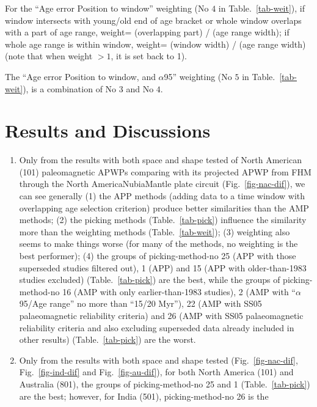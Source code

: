 For the ``Age error Position to window'' weighting (No $4$ in
Table.~\ref{tab-weit}), if window intersects with young/old end of age bracket
or whole window overlaps with a part of age range, weight= (overlapping part)
/ (age range width); if whole age range is within window, weight= (window width)
/ (age range width) (note that when weight $>1$, it is set back to 1).

The ``Age error Position to window, and $\alpha$95'' weighting (No $5$ in
Table.~\ref{tab-weit}), is a combination of No $3$ and No $4$.

\section{Results and Discussions}

\begin{enumerate}
  \item Only from the results with both space and shape tested of North American
        (101) paleomagnetic APWPs comparing with its projected APWP from FHM
        through the North America\textendash{}Nubia\textendash{}Mantle plate
        circuit (Fig.~\ref{fig-nac-dif}), we can see generally (1) the APP
        methods (adding data to a time window with overlapping age selection
        criterion) produce better similarities than the AMP methods; (2) the
        picking methods (Table.~\ref{tab-pick}) influence the similarity more
        than the weighting methods (Table.~\ref{tab-weit}); (3) weighting also
        seems to make things worse (for many of the methods, no weighting is the
        best performer); (4) the groups of picking-method-no 25 (APP with those
        superseded studies filtered out), 1 (APP) and 15 (APP with
        older-than-1983 studies excluded) (Table.~\ref{tab-pick}) are the best,
        while the groups of picking-method-no 16 (AMP with only
        earlier-than-1983 studies), 2 (AMP with ``$\alpha$95/Age range'' no
        more than ``15\degree/20 Myr''), 22 (AMP with SS05 palaeomagnetic
        reliability criteria) and 26 (AMP with SS05 palaeomagnetic reliability
        criteria and also excluding superseded data already included in other
        results) (Table.~\ref{tab-pick}) are the worst.
  \item Only from the results with both space and shape tested
        (Fig.~\ref{fig-nac-dif}, Fig.~\ref{fig-ind-dif} and
        Fig.~\ref{fig-au-dif}), for both North America (101) and Australia
        (801), the groups of picking-method-no 25 and 1 (Table.~\ref{tab-pick})
        are the best; however, for India (501), picking-method-no 26 is the

\end{enumerate}
